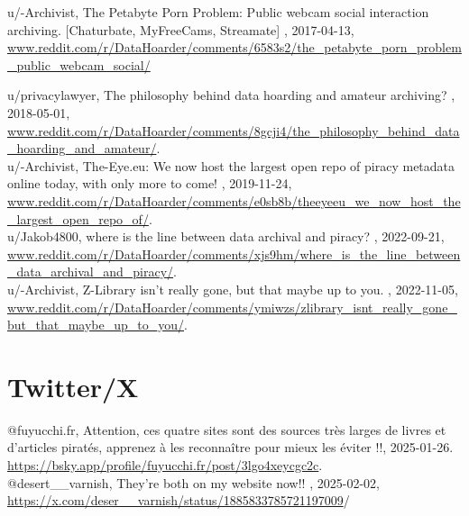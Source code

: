 u/-Archivist, \og The Petabyte Porn Problem: Public webcam social interaction archiving. [Chaturbate, MyFreeCams, Streamate] \fg, 2017-04-13, \href{www.reddit.com/r/DataHoarder/comments/6583s2/the\_petabyte\_porn\_problem\_public\_webcam\_social/}{www.reddit.com/r/DataHoarder/comments/6583s2/the\_petabyte\_porn\_problem\_public\_webcam\_social/}

u/privacylawyer, \og The philosophy behind data hoarding and amateur archiving? \fg, 2018-05-01, \href{www.reddit.com/r/DataHoarder/comments/8gcji4/the\_philosophy\_behind\_data\_hoarding\_and\_amateur/}{www.reddit.com/r/DataHoarder/comments/8gcji4/the\_philosophy\_behind\_data\_hoarding\_and\_amateur/}. \\

u/-Archivist, \og The-Eye.eu: We now host the largest open repo of piracy metadata online today, with only more to come! \fg, 2019-11-24, \href{www.reddit.com/r/DataHoarder/comments/e0sb8b/theeyeeu\_we\_now\_host\_the\_largest\_open\_repo\_of/}{www.reddit.com/r/DataHoarder/comments/e0sb8b/theeyeeu\_we\_now\_host\_the\_largest\_open\_repo\_of/}.\\

u/Jakob4800, \og where is the line between data archival and piracy? \fg, 2022-09-21, \href{www.reddit.com/r/DataHoarder/comments/xjs9hm/where\_is\_the\_line\_between\_data\_archival\_and\_piracy/}{www.reddit.com/r/DataHoarder/comments/xjs9hm/where\_is\_the\_line\_between\_data\_archival\_and\_piracy/}. \\

u/-Archivist, \og Z-Library isn't really gone, but that maybe up to you. \fg, 2022-11-05, \href{www.reddit.com/r/DataHoarder/comments/ymiwzs/zlibrary\_isnt\_really\_gone\_but\_that\_maybe\_up\_to\_you/}{www.reddit.com/r/DataHoarder/comments/ymiwzs/zlibrary\_isnt\_really\_gone\_but\_that\_maybe\_up\_to\_you/}. \\

\section*{Twitter/X}

@fuyucchi.fr, \og Attention, ces quatre sites sont des sources très larges de livres et d'articles piratés, apprenez à les reconnaître pour mieux les éviter !!\fg, 2025-01-26. \href{https://bsky.app/profile/fuyucchi.fr/post/3lgo4xeycgc2c}{https://bsky.app/profile/fuyucchi.fr/post/3lgo4xeycgc2c}. \\

@desert\_\_varnish, \og They're both on my website now!! \fg, 2025-02-02, \href{https://x.com/desert\_\_varnish/status/1885833785721197009}{https://x.com/deser\_\_varnish/status/1885833785721197009}/ \\


